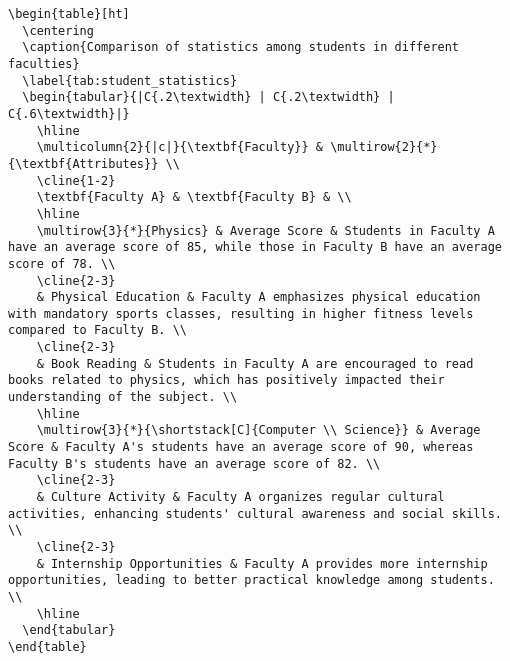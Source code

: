 \begin{lstlisting}[language={[LaTeX]TeX}, caption={Chèn một bảng vào báo cáo}, label={lst:insert-table}]
\begin{table}[ht]
  \centering
  \caption{Comparison of statistics among students in different faculties}
  \label{tab:student_statistics}
  \begin{tabular}{|C{.2\textwidth} | C{.2\textwidth} | C{.6\textwidth}|}
    \hline
    \multicolumn{2}{|c|}{\textbf{Faculty}} & \multirow{2}{*}{\textbf{Attributes}} \\
    \cline{1-2}
    \textbf{Faculty A} & \textbf{Faculty B} & \\
    \hline
    \multirow{3}{*}{Physics} & Average Score & Students in Faculty A have an average score of 85, while those in Faculty B have an average score of 78. \\
    \cline{2-3}
    & Physical Education & Faculty A emphasizes physical education with mandatory sports classes, resulting in higher fitness levels compared to Faculty B. \\
    \cline{2-3}
    & Book Reading & Students in Faculty A are encouraged to read books related to physics, which has positively impacted their understanding of the subject. \\
    \hline
    \multirow{3}{*}{\shortstack[C]{Computer \\ Science}} & Average Score & Faculty A's students have an average score of 90, whereas Faculty B's students have an average score of 82. \\
    \cline{2-3}
    & Culture Activity & Faculty A organizes regular cultural activities, enhancing students' cultural awareness and social skills. \\
    \cline{2-3}
    & Internship Opportunities & Faculty A provides more internship opportunities, leading to better practical knowledge among students. \\
    \hline
  \end{tabular}
\end{table}
\end{lstlisting}

